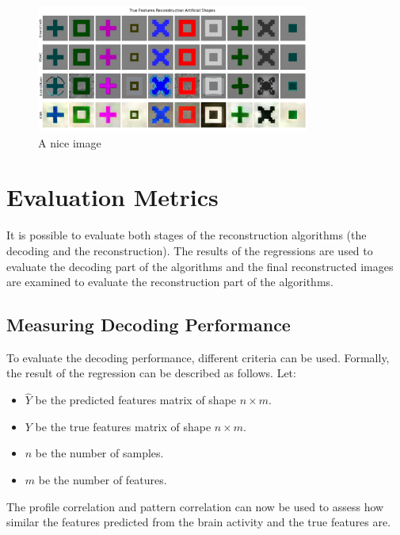 \begin{figure}[ht]
    \centering
    \includegraphics[width=0.8\textwidth]{plots/baseline_qual_true_recon_art.JPEG}
    \caption{A nice image}\label{fig:baselinetruerecon_art}
\end{figure}


\section{Evaluation Metrics}

It is possible to evaluate both stages of the reconstruction algorithms (the decoding and the reconstruction). The results of the regressions are used to evaluate the decoding part of the algorithms and the final reconstructed images are examined to evaluate the reconstruction part of the algorithms.

\subsection{Measuring Decoding Performance}
To evaluate the decoding performance, different criteria can be used. Formally, the result of the regression can be described as follows. Let:
\begin{itemize}
    \item \( \hat{Y} \) be the predicted features matrix of shape \( n \times m \).
    \item \( Y \) be the true features matrix of shape \( n \times m \).
    \item \( n \) be the number of samples.
    \item \( m \) be the number of features.
\end{itemize}

The profile correlation and pattern correlation can now be used to assess how similar the features predicted from the brain activity and the true features are\cite{horikawaGenericDecodingSeen2017}. 

